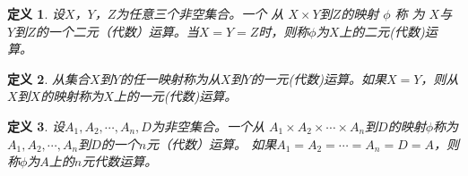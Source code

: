 \documentclass{book}[oneside]
\newtheorem{Def}{定义}[chapter]
\begin{document}
\begin{CJK*}{UTF8}{gbsn}
       



  \begin{Def}
    设$X$，$Y$，$Z$为任意三个非空集合。一个 从 $X\times Y$到$Z$的映射 $\phi$ 称 为 $X$与$Y$到$Z$的一个二元（代数）运算。当$X=Y=Z$时，则称$\phi$为$X$上的二元(代数)运算。
  \end{Def}
  \begin{Def}
    从集合$X$到$Y$的任一映射称为从$X$到$Y$的一元(代数)运算。如果$X=Y$，则从$X$到$X$的映射称为$X$上的一元(代数)运算。
  \end{Def}
  \begin{Def}
    设$A_1, A_2, \cdots, A_n, D$为非空集合。一个从 $A_1\times A_2\times \cdots \times A_n$到$D$的映射$\phi$称为$A_1, A_2, \cdots, A_n$到$D$的一个$n$元（代数）运算。
    如果$A_1=A_2=\cdots=A_n=D=A$，则称$\phi$为$A$上的$n$元代数运算。
  \end{Def}


\end{CJK*}
\end{document}
